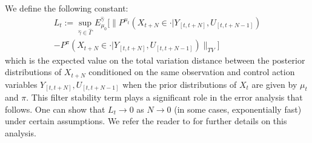 \documentclass[letterpaper, 10 pt, conference]{ieeeconf}  %
\theoremstyle{definition}
\newtheorem{definition}{Definition}
\theoremstyle{remark}
\newcommand{\dd}{\mathrm{d}}
\begin{document}
We define the following constant:
\begin{align}\label{loss_constant}
L_t:=\sup_{\hat{\gamma}\in\hat{\Gamma}}E_{\mu_0}^{\hat{\gamma}}\bigg[\|P^{\mu_t}(X_{t+N}\in\cdot|Y_{[t,t+N]},U_{[t,t+N-1]})\nonumber\\
-P^{\pi}(X_{t+N}\in\cdot|Y_{[t,t+N]},U_{[t,t+N-1]})\|_{TV}\bigg]
\end{align} 
which is the expected value on the total variation distance between the posterior distributions of $X_{t+N}$ conditioned on the same observation and control action variables $Y_{[t,t+N]},U_{[t,t+N-1]}$ when the prior distributions of $X_{t}$ are given by $\mu_t$ and $\pi$. This filter stability term plays a significant role in the error analysis that follows. One can show that $L_t \to 0$ as $N\to 0$ (in some cases, exponentially fast) under certain assumptions. We refer the reader to \cite{kara2020near,kara2023convergence,mcdonald2020exponential} for further details on this analysis. %
\end{document}
